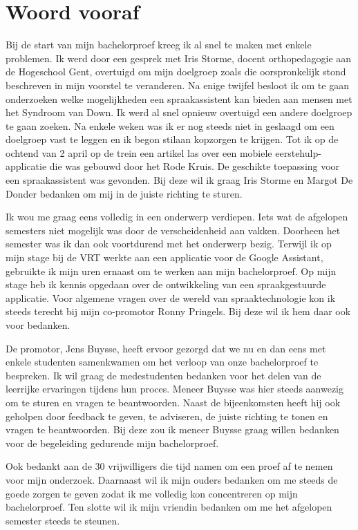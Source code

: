 
\chapter*{Woord vooraf}
\label{ch:voorwoord}


Bij de start van mijn bachelorproef kreeg ik al snel te maken met enkele problemen. Ik werd door een gesprek met Iris Storme, docent orthopedagogie aan de Hogeschool Gent, overtuigd om mijn doelgroep zoals die oorspronkelijk stond beschreven in mijn voorstel te veranderen. Na enige twijfel besloot ik om te gaan onderzoeken welke mogelijkheden een spraakassistent kan bieden aan mensen met het Syndroom van Down. Ik werd al snel opnieuw overtuigd een andere doelgroep te gaan zoeken. Na enkele weken was ik er nog steeds niet in geslaagd om een doelgroep vast te leggen en ik begon stilaan kopzorgen te krijgen. Tot ik op de ochtend van 2 april op de trein een artikel las over een mobiele eerstehulp-applicatie die was gebouwd door het Rode Kruis. De geschikte toepassing voor een spraakassistent was gevonden. Bij deze wil ik graag Iris Storme en Margot De Donder bedanken om mij in de juiste richting te sturen.

Ik wou me graag eens volledig in een onderwerp verdiepen. Iets wat de afgelopen semesters niet mogelijk was door de verscheidenheid aan vakken. Doorheen het semester was ik dan ook voortdurend met het onderwerp bezig. Terwijl ik op mijn stage bij de VRT werkte aan een applicatie voor de Google Assistant, gebruikte ik mijn uren ernaast om te werken aan mijn bachelorproef. Op mijn stage heb ik kennis opgedaan over de ontwikkeling van een spraakgestuurde applicatie. Voor algemene vragen over de wereld van spraaktechnologie kon ik steeds terecht bij mijn co-promotor Ronny Pringels. Bij deze wil ik hem daar ook voor bedanken.

De promotor, Jens Buysse, heeft ervoor gezorgd dat we nu en dan eens met enkele studenten samenkwamen om het verloop van onze bachelorproef te bespreken. Ik wil graag de medestudenten bedanken voor het delen van de leerrijke ervaringen tijdens hun proces. Meneer Buysse was hier steeds aanwezig om te sturen en vragen te beantwoorden. Naast de bijeenkomsten heeft hij ook geholpen door feedback te geven, te adviseren, de juiste richting te tonen en vragen te beantwoorden. Bij deze zou ik meneer Buysse graag willen bedanken voor de begeleiding gedurende mijn bachelorproef.

Ook bedankt aan de 30 vrijwilligers die tijd namen om een proef af te nemen voor mijn onderzoek. Daarnaast wil ik mijn ouders bedanken om me steeds de goede zorgen te geven zodat ik me volledig kon concentreren op mijn bachelorproef. Ten slotte wil ik mijn vriendin bedanken om me het afgelopen semester steeds te steunen.
